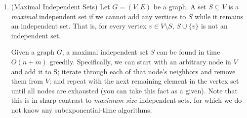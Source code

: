 \documentclass[11pt]{article}
\newenvironment{soln}{%
  \par\medskip\noindent\begingroup\color{blue}\textbf{Solution.}\ %
}{%
  \endgroup\par\medskip%
}
\begin{document}
\begin{enumerate}
\begin{enumerate}
\begin{figure} [H]
    \end{figure}

\begin{soln}

1. Squares a1 through e5 get their own vertices

2. Valid edges are formed (e.g. (a1,b3) but not (b2, d3))

3.1. Calling the Oracle on top-left and bottom-right corners returns $\bot$.

3.2. Calling the Oracle on top-right triggers BFS.

3.2.1 $F_0=$\{a1\} and pred[] is empty

3.2.2 $F_1=$\{b3,c2\}, pred[b3]=pred[c2]=a1.

3.2.3 $F_2=$\{c5,d2,e3\}, pred[c5]=pred[d2]=b3, pred[e3]=c2

3.2.4 $F_3=$\{a4,e4,c4,d1\}, pred[a4]=pred[e4]=[c5], pred[c4]=d2, pred[d1]=e3

3.2.5 $F_4=$\{b2,e5\}, pred[b2]=a4, pred[e5]=c4

3.2.6 $p=($e5,pred[e5]$)$

3.2.7 $p=($e5,c4,pred[c4]$)$

3.2.8 $p=($e5,c4,d2,pred[d2]$)$

3.2.9 $p=($e5,c4,d2,b3,pred[b3]$)$

3.2.10 $p=($e5,c4,d2,b3,a1$)$

3.2.11 $p=($a1,b3,d2,c4,e5$)$
\end{soln}
\end{enumerate}

\item (Maximal Independent Sets) \label{prob:maximalIS} Let $G=(V,E)$ be a graph. A set $S\subseteq V$ is a {\em maximal} independent set if we cannot add any vertices to $S$ while it remains an independent set. That is, for every vertex $v\in V\setminus S$, $S\cup\{v\}$ is not an independent set.

Given a graph $G$, a maximal independent set $S$ can be found in time $O(n+m)$ greedily. Specifically, we can start with an arbitrary node in $V$ and add it to S; iterate through each of that node's neighbors and remove them from $V$; and repeat with the next remaining element in the vertex set until all nodes are exhausted (you can take this fact as a given). Note that this is in sharp contrast to {\em maximum-size} independent sets, for which we do not know any subexponential-time algorithms.


\end{enumerate}
\end{document}
